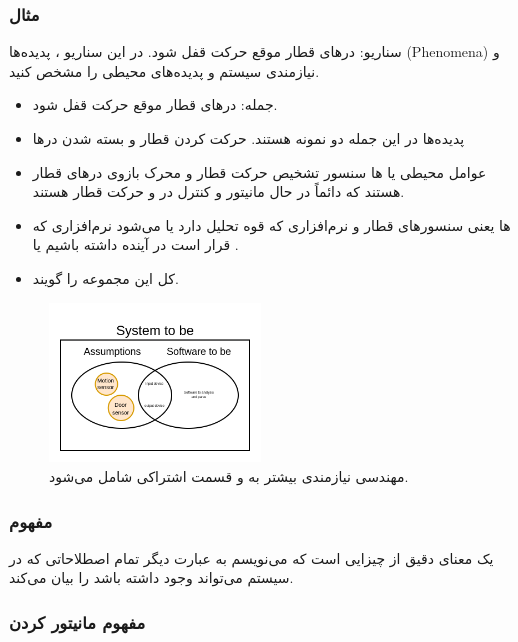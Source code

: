 \subsubsection{مثال}

سناریو: در‌های قطار موقع حرکت قفل شود. در این سناریو ، پدیده‌ها
(Phenomena) و نیازمندی سیستم و پدیده‌های محیطی را مشخص کنید.

\begin{itemize}
    \item جمله: در‌های قطار موقع حرکت قفل شود.
    \item پدیده‌ها در این جمله دو نمونه هستند. حرکت کردن قطار و بسته شدن در‌ها
    \item عوامل محیطی یا ها سنسور تشخیص حرکت قطار و محرک بازوی
    در‌های قطار هستند که دائماً در حال مانیتور و کنترل در‌ و حرکت قطار هستند.
    \item {}ها یعنی سنسور‌های قطار و نرم‌افزاری که قوه تحلیل دارد
    یا  می‌شود نرم‌افزاری که قرار است در آینده داشته
    باشیم یا .
    \item کل این مجموعه را  گویند.
\end{itemize}

\begin{figure}[H]
    \centering
    \includegraphics[width=0.5\textwidth]{images/system_to_be.png}
    \caption{مهندسی نیازمندی بیشتر به  و قسمت اشتراکی شامل می‌شود.}
    \label{fig: systemToBe}
\end{figure}

\subsubsection{مفهوم }

یک معنای دقیق از چیزایی است که می‌نویسم به عبارت دیگر تمام اصطلاحاتی که در سیستم
می‌تواند وجود داشته باشد را بیان می‌کند.

\subsubsection{مفهوم مانیتور کردن}

